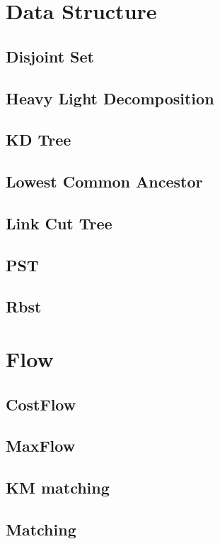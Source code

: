 \section{Data Structure}
\subsection{Disjoint Set}

\subsection{Heavy Light Decomposition}

\subsection{KD Tree}

\subsection{Lowest Common Ancestor}

\subsection{Link Cut Tree}

\subsection{PST}

\subsection{Rbst}


\section{Flow}
\subsection{CostFlow}

\subsection{MaxFlow}

\subsection{KM matching}

\subsection{Matching}



